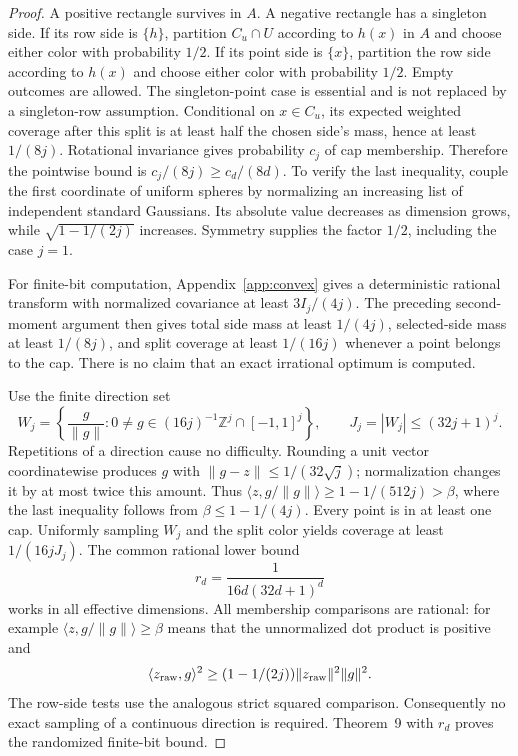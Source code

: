 \begin{proof}
A positive rectangle survives in $A$. A negative rectangle has a singleton side. If its row side is $\{h\}$, partition $C_u\cap U$ according to $h(x)$ in $A$ and choose either color with probability $1/2$. If its point side is $\{x\}$, partition the row side according to $h(x)$ and choose either color with probability $1/2$. Empty outcomes are allowed. The singleton-point case is essential and is not replaced by a singleton-row assumption. Conditional on $x\in C_u$, its expected weighted coverage after this split is at least half the chosen side's mass, hence at least $1/(8j)$. Rotational invariance gives probability $c_j$ of cap membership. Therefore the pointwise bound is $c_j/(8j)\ge c_d/(8d)$. To verify the last inequality, couple the first coordinate of uniform spheres by normalizing an increasing list of independent standard Gaussians. Its absolute value decreases as dimension grows, while $\sqrt{1-1/(2j)}$ increases. Symmetry supplies the factor $1/2$, including the case $j=1$.

For finite-bit computation, Appendix~\ref{app:convex} gives a deterministic rational transform with normalized covariance at least $3I_j/(4j)$. The preceding second-moment argument then gives total side mass at least $1/(4j)$, selected-side mass at least $1/(8j)$, and split coverage at least $1/(16j)$ whenever a point belongs to the cap. There is no claim that an exact irrational optimum is computed.

Use the finite direction set
\[
 W_j=\left\{\frac{g}{\|g\|}:0\ne g\in(16j)^{-1}\mathbb Z^j\cap[-1,1]^j\right\},
 \qquad J_j=|W_j|\le(32j+1)^j.
\]
Repetitions of a direction cause no difficulty. Rounding a unit vector coordinatewise produces $g$ with $\|g-z\|\le1/(32\sqrt j)$; normalization changes it by at most twice this amount. Thus $\langle z,g/\|g\|\rangle\ge1-1/(512j)>\beta$, where the last inequality follows from $\beta\le1-1/(4j)$. Every point is in at least one cap. Uniformly sampling $W_j$ and the split color yields coverage at least $1/(16jJ_j)$. The common rational lower bound
\begin{equation}\label{eq:netr}
 r_d=\frac1{16d(32d+1)^d}
\end{equation}
works in all effective dimensions. All membership comparisons are rational: for example $\langle z,g/\|g\|\rangle\ge\beta$ means that the unnormalized dot product is positive and
\[
 \langle z_{\rm raw},g\rangle^2\ge(1-1/(2j))\|z_{\rm raw}\|^2\|g\|^2.
\] The row-side tests use the analogous strict squared comparison. Consequently no exact sampling of a continuous direction is required. Theorem~9 with $r_d$ proves the randomized finite-bit bound.


\end{proof}
